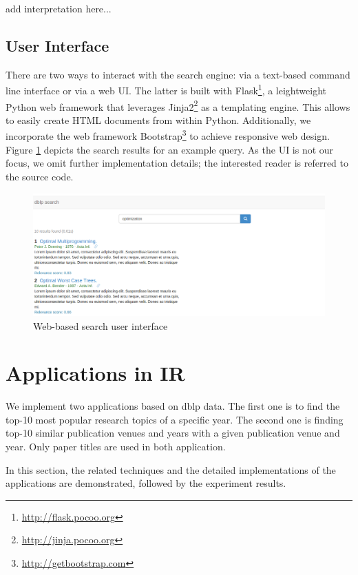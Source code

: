 \documentclass{sig-alternate-05-2015}
\begin{document}
add interpretation here...   

\subsection{User Interface}

There are two ways to interact with the search engine: via a text-based command line interface or via a web UI. The latter is built with Flask\footnote{\url{http://flask.pocoo.org}}, a leightweight Python web framework that leverages Jinja2\footnote{\url{http://jinja.pocoo.org}} as a templating engine. This allows to easily create HTML documents from within Python. Additionally, we incorporate the web framework Bootstrap\footnote{\url{http://getbootstrap.com}} to achieve responsive web design. Figure \ref{fig:search} depicts the search results for an example query. As the UI is not our focus, we omit further implementation details; the interested reader is referred to the source code.

\begin{figure}[th]
\centering
\includegraphics[width=.8\textwidth]{img/search}
\caption{Web-based search user interface}
\label{fig:search}
\end{figure}

\section{Applications in IR} \label{sec:ir}
We implement two applications based on dblp data. The first one is to find the top-10 most popular research topics of a specific year. The second one is finding top-10 similar publication venues and years with a given publication venue and year. Only paper titles are used in both application.

In this section, the related techniques and the detailed implementations of the applications are demonstrated, followed by the experiment results.
\end{document}
